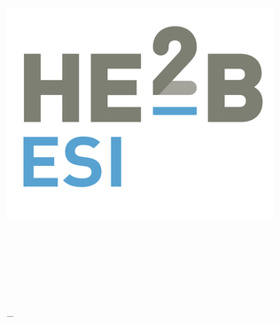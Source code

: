 
\thispagestyle{empty}

\includegraphics[scale=1]{image/esi}
\quad
\begin{minipage}[t]{7cm}
	\vspace{-4\baselineskip}
	\sffamily\large
	\textbf{\ecole\\\entite\\\etude}
	\bigskip\\
	\entiteadresse\\\entitetel{} – \entitemail
\end{minipage}

\vfill
\begin{center}
	\sffamily
	\LARGE\ue\\
	\Huge\cours
	\bigskip\\
	\Large\annee
\end{center}
\vfill

\begin{center}
	\Large\auteur
\end{center}
